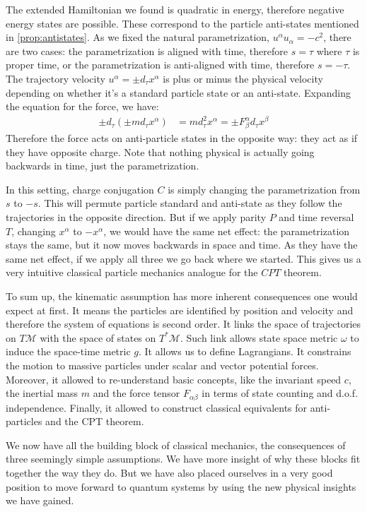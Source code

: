 \documentclass[aps,pra,10pt,twocolumn,floatfix,nofootinbib]{revtex4-1}
\numberwithin{equation}{section}
\theoremstyle{definition}
\begin{document}
The extended Hamiltonian we found is quadratic in energy, therefore negative energy states are possible. These correspond to the particle anti-states mentioned in \ref{prop:antistates}. As we fixed the natural parametrization, $u^\alpha u_\alpha = - c^2$, there are two cases: the parametrization is aligned with time, therefore $s=\tau$ where $\tau$ is proper time, or the parametrization is anti-aligned with time, therefore $s=-\tau$. The trajectory velocity $u^\alpha= \pm d_\tau x^\alpha$ is plus or minus the physical velocity depending on whether it's a standard particle state or an anti-state. Expanding the equation for the force, we have:
\begin{align*}
\pm d_\tau (\pm m d_\tau x^\alpha) &= m d_\tau^2 x^\alpha = \pm  F^\alpha_\beta d_\tau x^\beta
\end{align*}
Therefore the force acts on anti-particle states in the opposite way: they act as if they have opposite charge. Note that nothing physical is actually going backwards in time, just the parametrization.

In this setting, charge conjugation $C$ is simply changing the parametrization from $s$ to $-s$. This will permute particle standard and anti-state as they follow the trajectories in the opposite direction. But if we apply parity $P$ and time reversal $T$, changing $x^\alpha$ to $-x^\alpha$, we would have the same net effect: the parametrization stays the same, but it now moves backwards in space and time. As they have the same net effect, if we apply all three we go back where we started. This gives us a very intuitive classical particle mechanics analogue for the $CPT$ theorem.

To sum up, the kinematic assumption has more inherent consequences one would expect at first. It means the particles are identified by position and velocity and therefore the system of equations is second order. It links the space of trajectories on $T\mathcal{M}$ with the space of states on $T^*\mathcal{M}$. Such link allows state space metric $\omega$ to induce the space-time metric $g$. It allows us to define Lagrangians. It constrains the motion to massive particles under scalar and vector potential forces. Moreover, it allowed to re-understand basic concepts, like the invariant speed $c$, the inertial mass $m$ and the force tensor $F_{\alpha\beta}$ in terms of state counting and d.o.f. independence. Finally, it allowed to construct classical equivalents for anti-particles and the CPT theorem.

We now have all the building block of classical mechanics, the consequences of three seemingly simple assumptions. We have more insight of why these blocks fit together the way they do. But we have also placed ourselves in a very good position to move forward to quantum systems by using the new physical insights we have gained.
\end{document}
